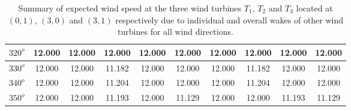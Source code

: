 \begin{table}[H]
\begin{tabular}{|c|c|c|c|c|c|c|c|c|c|}
	         \hline
	         $320^{o}$ & 12.000 & 12.000 & 12.000 & 12.000 & 12.000 & 12.000 & 12.000& 12.000 & 12.000  \\
	         \hline
	         $330^{o}$ & 12.000 & 12.000 & 11.182 & 12.000 & 12.000 & 12.000 & 11.182 & 12.000 & 12.000  \\
	         \hline
	         $340^{o}$ & 12.000 & 12.000 & 11.204 & 12.000 & 12.000 & 12.000 & 11.204 & 12.000 & 12.000  \\
	         \hline
	         $350^{o}$ & 12.000 & 12.000 & 11.193 & 12.000 & 11.129 & 12.000 & 12.000 & 11.193 & 11.129  \\
	         \hline
	         
	    \end{tabular}
	    
	    \caption{Summary of expected wind speed at the three wind turbines $T_1$, $T_2$ and $T_3$ located at $(0,1)$, $(3,0)$ and $(3,1)$ respectively due to individual and overall wakes of other wind turbines for all wind directions.}
	    \label{summaryRandom1-3a}
	\end{table}
	\doublespacing
	
